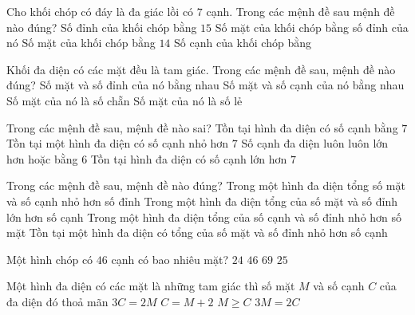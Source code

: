 \begin{ex}%
	Cho khối chóp có đáy là đa giác lồi có $7$ cạnh. Trong các mệnh đề sau mệnh đề nào đúng?
	\choice
	{Số đỉnh của khối chóp bằng $15$}
	{\True Số mặt của khối chóp bằng số đỉnh của nó}
	{Số mặt của khối chóp bằng $14$}
	{Số cạnh của khối chóp bằng}
\end{ex}
\begin{ex}%
	Khối đa diện có các mặt đều là tam giác. Trong các mệnh đề sau, mệnh đề nào đúng?
	\choice
	{Số mặt và số đỉnh của nó bằng nhau}
	{Số mặt và số cạnh của nó bằng nhau}
	{\True Số mặt của nó là số chẵn}
	{Số mặt của nó là số lẻ}
\end{ex}
\begin{ex}%
	Trong các mệnh đề sau, mệnh đề nào sai?
	\choice
	{\True Tồn tại hình đa diện có số cạnh bằng $7$}
	{Tồn tại một hình đa diện có số cạnh nhỏ hơn $7$}
	{Số cạnh đa diện luôn luôn lớn hơn hoặc bằng $6$}
	{Tồn tại hình đa diện có số cạnh lớn hơn $7$}
\end{ex}
\begin{ex}%
	Trong các mệnh đề sau, mệnh đề nào đúng?
	\choice
	{Trong một hình đa diện tổng số mặt và số cạnh nhỏ hơn số đỉnh}
	{\True Trong một hình đa diện tổng của số mặt và số đỉnh lớn hơn số cạnh}
	{Trong một hình đa diện tổng của số cạnh và số đỉnh nhỏ hơn số mặt}
	{Tồn tại một hình đa diện có tổng của số mặt và số đỉnh nhỏ hơn số cạnh}
\end{ex}
\begin{ex}%
	Một hình chóp có $46$ cạnh có bao nhiêu mặt?
	\choice
	{\True $24$}
	{$46$}
	{$69$}
	{$25$}
\end{ex}
\begin{ex}%
	Một hình đa diện có các mặt là những tam giác thì số mặt $M$ và số cạnh $C$ của đa diện đó thoả mãn
	\choice
	{$3C=2M$}
	{$C=M+2$}
	{$M\geq C$}
	{\True $3M=2C$}
\end{ex}
